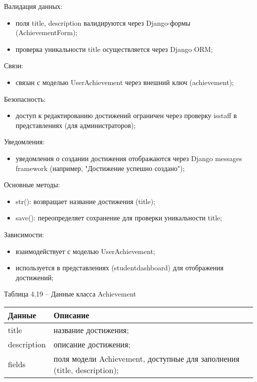Валидация данных: 
\begin{itemize}
	\item поля title, description валидируются через Django-формы (AchievementForm); 
	\item проверка уникальности title осуществляется через Django ORM; 
\end{itemize}

Связи: 
\begin{itemize}
	\item связан с моделью UserAchievement через внешний ключ (achievement); 
\end{itemize}

Безопасность: 
\begin{itemize}
	\item доступ к редактированию достижений ограничен через проверку isstaff в представлениях (для администраторов); 
\end{itemize}

Уведомления: 
\begin{itemize}
	\item уведомления о создании достижения отображаются через Django messages framework (например, "Достижение успешно создано"); 
\end{itemize}

Основные методы: 
\begin{itemize}
	\item str(): возвращает название достижения (title); 
	\item save(): переопределяет сохранение для проверки уникальности title; 
\end{itemize}

Зависимости: 
\begin{itemize}
	\item взаимодействует с моделью UserAchievement; 
	\item используется в представлениях (studentdashboard) для отображения достижений; 
\end{itemize}

Таблица 4.19 – Данные класса Achievement \\
\begin{tabular}{|p{4cm}|p{8cm}|}
	\hline
	Данные & Описание \\
	\hline
	title & название достижения; \\
	description & описание достижения; \\
	fields & поля модели Achievement, доступные для заполнения (title, description); \\
	\hline
\end{tabular}

